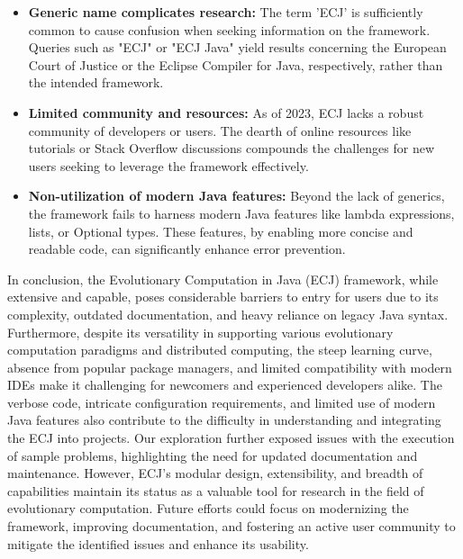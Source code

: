\begin{itemize}
    \item \textbf{Generic name complicates research:} The term 'ECJ' is sufficiently common to cause confusion when seeking information on the framework.
    Queries such as "ECJ" or "ECJ Java" yield results concerning the European Court of Justice or the Eclipse Compiler for Java, respectively, rather than the intended framework.

    \item \textbf{Limited community and resources:} As of 2023, ECJ lacks a robust community of developers or users.
    The dearth of online resources like tutorials or Stack Overflow discussions compounds the challenges for new users seeking to leverage the framework effectively.

    \item \textbf{Non-utilization of modern Java features:} Beyond the lack of generics, the framework fails to harness modern Java features like lambda expressions, lists, or Optional types.
    These features, by enabling more concise and readable code, can significantly enhance error prevention.
  \end{itemize}

  In conclusion, the Evolutionary Computation in Java (ECJ) framework, while extensive and capable, poses considerable barriers to entry for users due to its complexity, outdated documentation, and heavy reliance on legacy Java syntax.
  Furthermore, despite its versatility in supporting various evolutionary computation paradigms and distributed computing, the steep learning curve, absence from popular package managers, and limited compatibility with modern IDEs make it challenging for newcomers and experienced developers alike.
  The verbose code, intricate configuration requirements, and limited use of modern Java features also contribute to the difficulty in understanding and integrating the ECJ into projects.
  Our exploration further exposed issues with the execution of sample problems, highlighting the need for updated documentation and maintenance.
  However, ECJ's modular design, extensibility, and breadth of capabilities maintain its status as a valuable tool for research in the field of evolutionary computation.
  Future efforts could focus on modernizing the framework, improving documentation, and fostering an active user community to mitigate the identified issues and enhance its usability.
